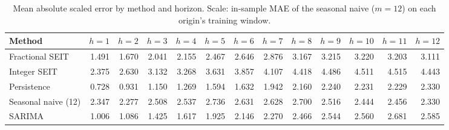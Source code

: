 \begin{table}[ht]
\centering
\small
\caption{Mean absolute scaled error by method and horizon. Scale: in-sample MAE of the seasonal naive ($m=12$) on each origin's training window.}
\label{tab:mase_h}
\begin{tabular}{lrrrrrrrrrrrr}
\hline
Method & $h=1$ & $h=2$ & $h=3$ & $h=4$ & $h=5$ & $h=6$ & $h=7$ & $h=8$ & $h=9$ & $h=10$ & $h=11$ & $h=12$ \\
\hline
Fractional SEIT & 1.491 & 1.670 & 2.041 & 2.155 & 2.467 & 2.646 & 2.876 & 3.167 & 3.215 & 3.220 & 3.203 & 3.111 \\
Integer SEIT & 2.375 & 2.630 & 3.132 & 3.268 & 3.631 & 3.857 & 4.107 & 4.418 & 4.486 & 4.511 & 4.515 & 4.443 \\
Persistence & 0.728 & 0.931 & 1.150 & 1.269 & 1.594 & 1.632 & 1.942 & 2.160 & 2.240 & 2.231 & 2.229 & 2.330 \\
Seasonal naive (12) & 2.347 & 2.277 & 2.508 & 2.537 & 2.736 & 2.631 & 2.628 & 2.700 & 2.516 & 2.444 & 2.456 & 2.330 \\
SARIMA & 1.006 & 1.086 & 1.425 & 1.617 & 1.925 & 2.146 & 2.270 & 2.466 & 2.544 & 2.560 & 2.681 & 2.585 \\
\hline
\end{tabular}
\end{table}
